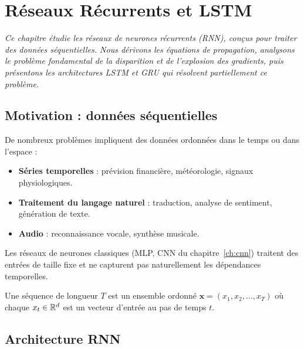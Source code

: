 \chapter{R\'eseaux R\'ecurrents et LSTM}
\label{ch:rnn_lstm}

\noindent\textit{Ce chapitre \'etudie les r\'eseaux de neurones r\'ecurrents (RNN), con\c{c}us
pour traiter des donn\'ees s\'equentielles. Nous d\'erivons les \'equations de
propagation, analysons le probl\`eme fondamental de la disparition et de
l'explosion des gradients, puis pr\'esentons les architectures LSTM et GRU qui
r\'esolvent partiellement ce probl\`eme.}\medskip

\section{Motivation : donn\'ees s\'equentielles}
\label{sec:rnn-motivation}

De nombreux probl\`emes impliquent des donn\'ees ordonn\'ees dans le temps ou
dans l'espace :
\begin{itemize}
  \item \textbf{S\'eries temporelles} : pr\'evision financi\`ere, m\'et\'eorologie,
    signaux physiologiques.
  \item \textbf{Traitement du langage naturel} : traduction, analyse de sentiment,
    g\'en\'eration de texte.
  \item \textbf{Audio} : reconnaissance vocale, synth\`ese musicale.
\end{itemize}

Les r\'eseaux de neurones classiques (MLP, CNN du chapitre~\ref{ch:cnn})
traitent des entr\'ees de taille fixe et ne capturent pas naturellement les
d\'ependances temporelles.

\begin{definition}[S\'equence]
Une s\'equence de longueur $T$ est un ensemble ordonn\'e
$\mathbf{x} = (x_1, x_2, \ldots, x_T)$ o\`u chaque $x_t \in \mathbb{R}^d$ est un
vecteur d'entr\'ee au pas de temps $t$.
\end{definition}

\section{Architecture RNN}
\label{sec:rnn-arch}

